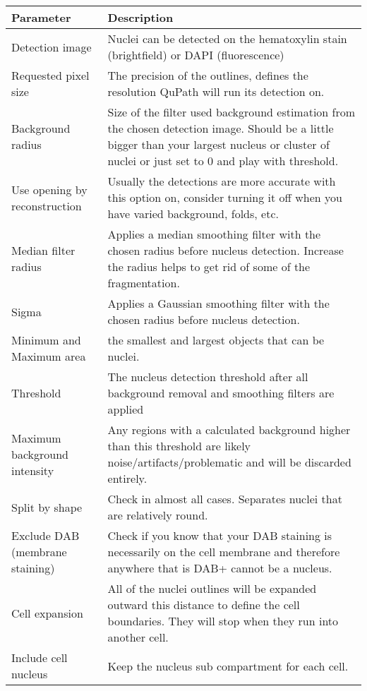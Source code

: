 \documentclass[a4paper,DIV=17,dvipsnames,headsepline]{scrartcl}
\begin{document}
\begin{table}
\begin{center}\scriptsize
\begin{tabular}{p{4cm}p{10cm}} \toprule
     Parameter & Description \\ \midrule
     Detection image&  Nuclei can be detected on the hematoxylin stain (brightfield) or DAPI (fluorescence)\\
     Requested pixel size & The precision of the outlines, defines the resolution QuPath will run its detection on.\\
     Background radius& Size of the filter used background estimation from the chosen detection image. Should be a little bigger than your largest nucleus or cluster of nuclei or just set to 0 and play with threshold. \\
     Use opening by reconstruction & Usually the detections are more accurate with this option on, consider turning it off when you have varied background, folds, etc. \\
     Median filter radius & Applies a median smoothing filter with the chosen radius before nucleus detection. Increase the radius helps to get rid of some of the fragmentation. \\ 
     Sigma & Applies a Gaussian smoothing filter with the chosen radius before nucleus detection.
     \\ 
     Minimum and Maximum area & the smallest and largest objects that can be nuclei.  \\ 
     Threshold& The nucleus detection threshold after all background removal and smoothing filters are applied \\  
    Maximum background intensity& Any regions with a calculated background higher than this threshold  are likely noise/artifacts/problematic and will be discarded entirely.\\
    Split by shape& Check in almost all cases. Separates nuclei that are relatively round.\\
    Exclude DAB (membrane staining) & Check if you know that your DAB staining is necessarily on the cell membrane and therefore anywhere that is DAB+ cannot be a nucleus. \\
    Cell expansion& All of the nuclei outlines will be expanded outward this distance to define the cell boundaries. They will stop when they run into another cell.\\
    Include cell nucleus& Keep the nucleus sub compartment for each cell.\\

\end{tabular}
\end{center}
\end{table}
\end{document}
